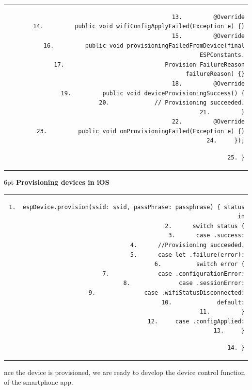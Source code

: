 \documentclass[a4paper,12pt,openany]{book}
\renewcommand{\ttfamily}{\fontfamily{pcr}\selectfont}
\renewcommand{\arraystretch}{1}
\newenvironment{codebloc}{ %
    \ttfamily\footnotesize
    \renewcommand{\arraystretch}{1}
}
\newcommand{\note}[2][NOTE]{ %
\vspace{6pt}
\begin{tabular}{b{\textwidth}}
\hline
\fontfamily{phv}\selectfont \textbf{#1}\\
\leftskip 1em #2\\
\hline
\end{tabular}
}
\begin{document}
\begin{codebloc}
\begin{tabular}{d}
\vspace{2pt}
\begin{verbatim}
13.         @Override
14.         public void wifiConfigApplyFailed(Exception e) {}
15.         @Override
16.         public void provisioningFailedFromDevice(final ESPConstants.
17.                             Provision FailureReason failureReason) {}
18.         @Override
19.         public void deviceProvisioningSuccess() {
20.             // Provisioning succeeded.
21.         }
22.         @Override
23.         public void onProvisioningFailed(Exception e) {}
24.     });
\end{verbatim}
\verb|25. }|
\end{tabular}
\end{codebloc}

\vspace{6pt}
\textbf{Provisioning devices in iOS}


\begin{codebloc}
\begin{tabular}{d}
\vspace{2pt}
\begin{verbatim}
1.  espDevice.provision(ssid: ssid, passPhrase: passphrase) { status in
2.      switch status {
3.      case .success:
4.      //Provisioning succeeded.
5.      case let .failure(error):
6.          switch error {
7.              case .configurationError:
8.              case .sessionError:
9.              case .wifiStatusDisconnected:
10.             default:
11.         }
12.     case .configApplied:
13.     }
\end{verbatim}
\verb|14. }|
\end{tabular}
\end{codebloc}

Once the device is provisioned, we are ready to develop the device control function of the smartphone app.
\end{document}

